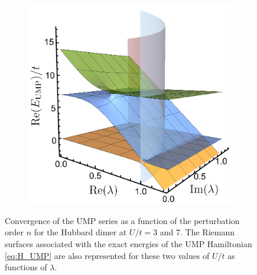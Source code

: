 \documentclass[aps,prb,reprint,noshowkeys,superscriptaddress]{revtex4-1}
\begin{document}
\begin{figure}
\begin{subfigure}{0.32\textwidth}
	\includegraphics[height=0.75\textwidth]{fig6c}	
    \end{subfigure}	\caption{
	Convergence of the UMP series as a function of the perturbation order $n$ for the Hubbard dimer at $U/t = 3$ and $7$.
	The Riemann surfaces associated with the exact energies of the UMP Hamiltonian \eqref{eq:H_UMP} are also represented for these two values of $U/t$ as functions of $\lambda$.
	\label{fig:UMP}}
\end{figure}
\end{document}
